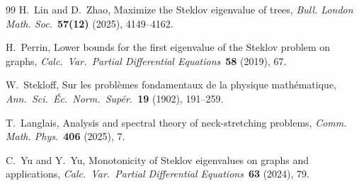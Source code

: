\documentclass[11pt]{article}
\theoremstyle{definition}
\theoremstyle{remark}
\begin{document}
\begin{thebibliography}{99}
H.~Lin and D.~Zhao,
Maximize the Steklov eigenvalue of trees, 
\emph{Bull. London Math. Soc.}\ \textbf{57(12)} (2025), 4149--4162.


H.~Perrin,
Lower bounds for the first eigenvalue of the Steklov problem on graphs,
\emph{Calc.\ Var.\ Partial Differential Equations}\ \textbf{58} (2019), 67.

W.~Stekloff,
Sur les probl\`emes fondamentaux de la physique math\'ematique,
\emph{Ann.\ Sci.\ \'Ec.\ Norm.\ Sup\'er.}\ \textbf{19} (1902), 191--259.


T.~Langlais,
Analysis and spectral theory of neck-stretching problems,
\emph{Comm. Math. Phys.}\ \textbf{406} (2025), 7.

C.~Yu and Y.~Yu,
Monotonicity of Steklov eigenvalues on graphs and applications,
\emph{Calc.\ Var.\ Partial Differential Equations}\ \textbf{63} (2024), 79.


\end{thebibliography}
\end{document}
